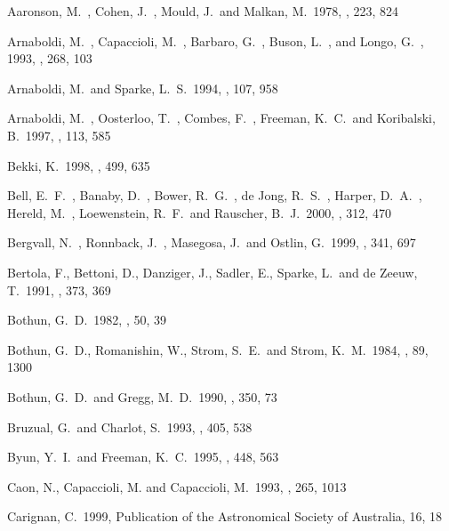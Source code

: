 \documentclass[preprint]{aastex}
\begin{document}
\newpage
\begin{thebibliography}{}

 Aaronson, M.\ , Cohen, 
J.\ , Mould, J.\ and Malkan, M.\ 1978, \aj, 223, 824

 Arnaboldi, M.\ ,
Capaccioli, M.\ , Barbaro, G.\ , Buson, L.\ , and Longo, G.\ , 1993, \aap, 268, 103

 Arnaboldi, M.\ and
Sparke, L.\ S.\ 1994, \aj, 107, 958

 Arnaboldi, M.\ , 
Oosterloo, T.\ , Combes, F.\ , Freeman, K.\ C.\ and Koribalski, B.\ 1997, \aj, 
113, 585 

 Bekki, K.\ 1998, \apj, 499, 635 

 Bell, E.\ F.\ ,
Banaby, D.\ , Bower, R.\ G.\ , de Jong, R.\ S.\ , Harper, D.\ A.\ ,
Hereld, M.\ , Loewenstein, R.\ F.\ and Rauscher, B.\ J.\ 2000, \mnras, 312, 470 

 Bergvall, N.\ ,
Ronnback, J.\ , Masegosa, J.\ and Ostlin, G.\ 1999, \aap, 341, 697 

 Bertola, F., Bettoni, 
D., Danziger, J., Sadler, E., Sparke, L.\ and de Zeeuw, T.\ 1991, \apj, 
373, 369 

 Bothun, G.\ D.\ 1982, \apjs, 50, 39

Bothun, G.\ D., Romanishin, W., Strom, S.\ E.\ and Strom, K.\ M.\ 1984, 
\aj, 89, 1300 

 Bothun, G.\ D.\ and 
Gregg, M.\ D.\ 1990, \apj, 350, 73 

 Bruzual, G.\ and 
Charlot, S.\ 1993, \apj, 405, 538

 Byun, Y.\ I.\ and 
Freeman, K.\ C.\ 1995, \apj, 448, 563 

 Caon, N., 
Capaccioli, M. and Capaccioli, M.\ 1993, \mnras, 265, 1013  

 Carignan, C.\ 
1999, Publication of the Astronomical Society of Australia, 16, 18  


\end{thebibliography}
\end{document}
